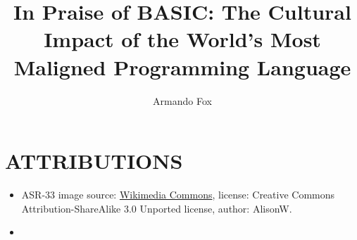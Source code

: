 \documentclass{article}
\title{In Praise of BASIC: The Cultural Impact of the World's Most
  Maligned Programming Language}
\author{Armando Fox}
\begin{document}

\maketitle











\section{ATTRIBUTIONS}

\begin{itemize}
\item ASR-33 image source:
  \href{http://en.wikipedia.org/wiki/File:Teletype_with_papertape_punch_and_reader.jpg}{Wikimedia
    Commons}, license: Creative Commons Attribution-ShareAlike 3.0
  Unported license, author: AlisonW.
\item 
\end{itemize}



\end{document}
